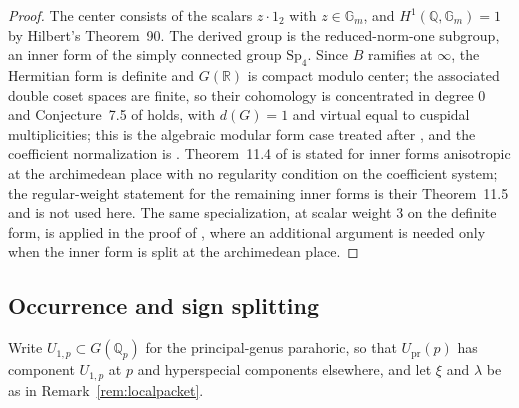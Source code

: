 \documentclass[11pt]{amsart}
\theoremstyle{plain}
\theoremstyle{definition}
\newcommand{\Q}{\mathbb{Q}}
\newcommand{\R}{\mathbb{R}}
\newcommand{\Sp}{\mathrm{Sp}}
\newcommand{\Upr}{U_{\mathrm{pr}}}
\providecommand{\Upr}{U_{\mathrm{pr}}}
\begin{document}
	\begin{proof}
		The center consists of the scalars $z\cdot1_2$ with
		$z\in\mathbb{G}_m$, and $H^1(\Q,\mathbb{G}_m)=1$ by Hilbert's
		Theorem~90. The derived group is the reduced-norm-one subgroup, an
		inner form of the simply connected group $\Sp_4$. Since $B$ ramifies
		at $\infty$, the Hermitian form is definite and $G(\R)$ is compact
		modulo center; the associated double coset spaces are finite, so
		their cohomology is concentrated in degree $0$ and Conjecture~7.5 of
		\cite{RoesnerWeissauer2021} holds, with $d(G)=1$ and virtual equal
		to cuspidal multiplicities; this is the algebraic modular form case
		treated after \cite[Cor.~7.4]{RoesnerWeissauer2021}, and the
		coefficient normalization is \cite[Lem.~9.1,
		Prop.~9.2]{RoesnerWeissauer2021}. Theorem~11.4 of
		\cite{RoesnerWeissauer2021} is stated for inner forms anisotropic at
		the archimedean place with no regularity condition on the
		coefficient system; the regular-weight statement for the remaining
		inner forms is their Theorem~11.5 and is not used here. The same
		specialization, at scalar weight $3$ on the definite form, is
		applied in the proof of \cite[Prop.~12.3]{RoesnerWeissauer2021},
		where an additional argument is needed only when the inner form is
		split at the archimedean place.
	\end{proof}
	
	\subsection{Occurrence and sign splitting}
	\label{ss:occurrence-theorem}
	
	Write $U_{1,p}\subset G(\Q_p)$ for the principal-genus parahoric, so
	that $\Upr(p)$ has component $U_{1,p}$ at $p$ and hyperspecial
	components elsewhere, and let $\xi$ and $\lambda$ be as in
	Remark~\ref{rem:localpacket}.
	
\end{document}
